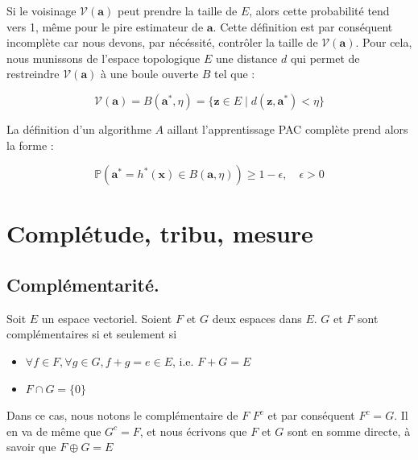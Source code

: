 \noindent Si le voisinage $\boldsymbol{\mathcal{V}}(\boldsymbol{a})$ peut prendre la taille de $E$, alors cette probabilité tend vers 1, même pour le pire estimateur de $\boldsymbol{a}$. Cette définition est par conséquent incomplète car nous devons, par nécéssité, 
contrôler la taille de $\boldsymbol{\mathcal{V}}(\boldsymbol{a})$. Pour cela, nous munissons de l'espace topologique $E$ une distance $d$ qui permet de restreindre $\mathcal{V}(\boldsymbol{a})$ à une boule ouverte $B$ tel que :

\begin{equation}
    \boldsymbol{\mathcal{V}}(\boldsymbol{a}) = B(\boldsymbol{a}^*, \eta) = \{ \boldsymbol{z} \in E \mid d(\boldsymbol{z}, \boldsymbol{a}^*) < \eta \}
\end{equation}

\noindent La définition d'un algorithme $A$ aillant l'apprentissage PAC complète prend alors la forme :

\begin{equation}
    \mathbb{P} \left( \boldsymbol{a}^{*} = h^{*}(\boldsymbol{x}) \in B(\boldsymbol{a}, \eta) \right) \ge 1 - \epsilon, \quad \epsilon > 0
\end{equation}

\vspace{10mm}

\section{Complétude, tribu, mesure}

\subsection{Complémentarité.} 

\noindent Soit $E$ un espace vectoriel. Soient $F$ et $G$ deux espaces dans $E$. $G$ et $F$ sont complémentaires si et seulement si 

\begin{itemize}
    \item $\forall f \in F, \forall g \in G, f + g = e \in E$, i.e. $F + G = E$ \newline
    \item $F \cap G = \{0\}$ \newline
\end{itemize}

\noindent Dans ce cas, nous notons le complémentaire de $F$ $F^{c}$ et par conséquent $F^{c} = G$. Il en va de même que $G^{c} = F$, et nous écrivons que $F$ et $G$ sont en somme directe, à savoir que $F \oplus G = E$ \newline

